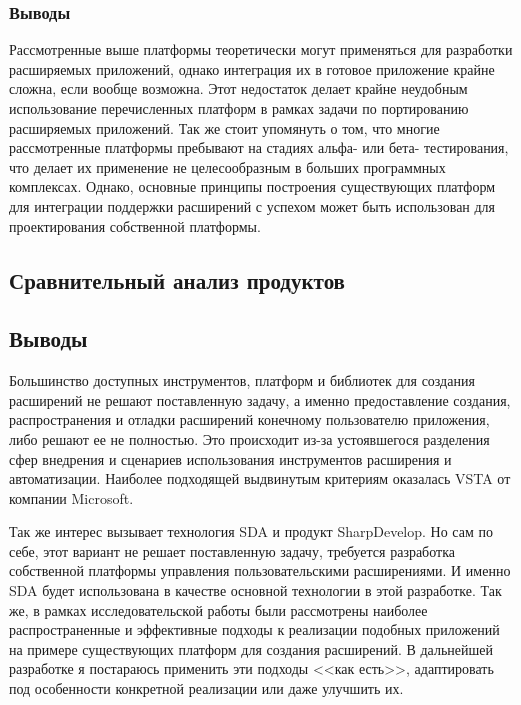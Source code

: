






\subsubsection{Выводы}

Рассмотренные выше платформы теоретически могут применяться для разработки расширяемых приложений, однако интеграция их в готовое приложение крайне сложна, если вообще возможна. Этот недостаток делает крайне неудобным использование перечисленных платформ в рамках задачи по портированию расширяемых приложений. Так же стоит упомянуть о том, что многие рассмотренные платформы пребывают на стадиях альфа- или бета- тестирования, что делает их применение не целесообразным в больших программных комплексах. Однако, основные принципы построения существующих платформ для интеграции поддержки расширений с успехом может быть использован для проектирования собственной платформы.

\subsection{Сравнительный анализ продуктов}




\subsection{Выводы}

Большинство доступных инструментов, платформ и библиотек для создания расширений не решают поставленную задачу, а именно предоставление создания, распространения и отладки расширений конечному пользователю приложения, либо решают ее не полностью. Это происходит из-за устоявшегося разделения сфер внедрения и сценариев использования инструментов расширения и автоматизации. Наиболее подходящей выдвинутым критериям оказалась VSTA от компании Microsoft.

Так же интерес вызывает технология SDA и продукт SharpDevelop. Но сам по себе, этот вариант не решает поставленную задачу, требуется разработка собственной платформы управления пользовательскими расширениями. И именно SDA будет использована в качестве основной технологии в этой разработке. Так же, в рамках исследовательской работы были рассмотрены наиболее распространенные и эффективные подходы к реализации подобных приложений на примере существующих платформ для создания расширений. В дальнейшей разработке я постараюсь применить эти подходы <<как есть>>, адаптировать под особенности конкретной реализации или даже улучшить их.

